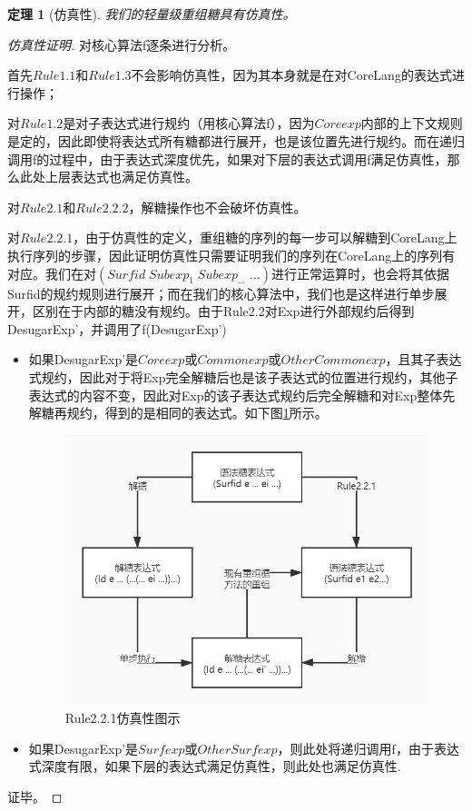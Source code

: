 \newtheorem{mythm}{定理}[section]
\begin{mythm}[仿真性]
	我们的轻量级重组糖具有仿真性。
\end{mythm}
\begin{proof}[仿真性证明]
	对核心算法f逐条进行分析。
	
	首先$Rule1.1$和$Rule1.3$不会影响仿真性，因为其本身就是在对CoreLang的表达式进行操作；
	
	对$Rule1.2$是对子表达式进行规约（用核心算法f），因为$Coreexp$内部的上下文规则是定的，因此即使将表达式所有糖都进行展开，也是该位置先进行规约。而在递归调用f的过程中，由于表达式深度优先，如果对下层的表达式调用f满足仿真性，那么此处上层表达式也满足仿真性。
	
	对$Rule2.1$和$Rule2.2.2$，解糖操作也不会破坏仿真性。
	
	对$Rule2.2.1$，由于仿真性的定义，重组糖的序列的每一步可以解糖到CoreLang上执行序列的步骤，因此证明仿真性只需要证明我们的序列在CoreLang上的序列有对应。我们在对$(Surfid\;Subexp_{1}\;Subexp_{\ldots}\;\ldots)$进行正常运算时，也会将其依据Surfid的规约规则进行展开；而在我们的核心算法中，我们也是这样进行单步展开，区别在于内部的糖没有规约。由于Rule2.2对Exp进行外部规约后得到DesugarExp'，并调用了f(DesugarExp')
	\begin{itemize}
		\item 如果DesugarExp'是$Coreexp$或$Commonexp$或$OtherCommonexp$，且其子表达式规约，因此对于将Exp完全解糖后也是该子表达式的位置进行规约，其他子表达式的内容不变，因此对Exp的该子表达式规约后完全解糖和对Exp整体先解糖再规约，得到的是相同的表达式。如下图\ref{fig:emulation}所示。
		
		\begin{figure}[h]
			\centering
			\includegraphics[width=12cm]{images/chapter3/flowgraph.jpg}
			\caption{Rule2.2.1仿真性图示}
			\label{fig:emulation}
		\end{figure}
		
		\item 如果DesugarExp'是$Surfexp$或$OtherSurfexp$，则此处将递归调用f，由于表达式深度有限，如果下层的表达式满足仿真性，则此处也满足仿真性.
	\end{itemize}

证毕。

\end{proof}






